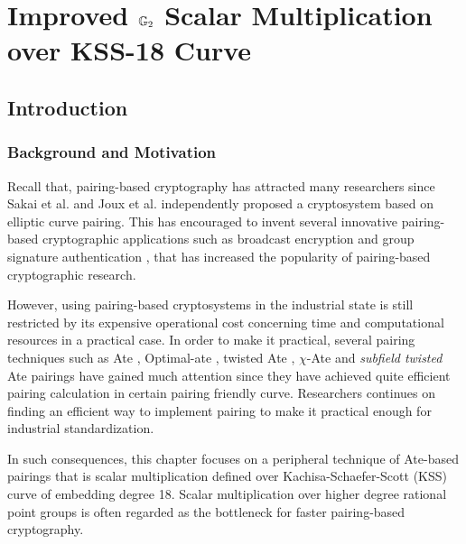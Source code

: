 \chapter{Improved \texorpdfstring{${\mathbb{G}}_{2}$}{G2} Scalar Multiplication over KSS-18 Curve} 
\label{Chapter_IEICE}
\section{Introduction}
\subsection{Background and Motivation}
Recall that, pairing-based cryptography has attracted many researchers since Sakai et al. \cite{EPRINT:SakKas03} and Joux et al. \cite{JC:Joux04} independently proposed a cryptosystem based on elliptic curve pairing. This has encouraged to invent several innovative pairing-based cryptographic applications such as broadcast encryption \cite{C:BonGenWat05} and group signature authentication \cite{C:BonBoySha04}, that has increased the popularity of pairing-based cryptographic research.

However, using pairing-based cryptosystems in the industrial state is still restricted by its expensive operational cost concerning time and computational resources in a practical case. 
In order to make it practical, several pairing techniques such as Ate \cite{DBLP:reference/crc/2005ehcc}, Optimal-ate \cite{DBLP:journals/tit/Vercauteren10}, twisted Ate \cite{EPRINT:MKHO07}, $\chi$-Ate \cite{PAIRING:NASKM08} and \textit{subfield twisted} Ate \cite{PAIRING:DevScoDah07} pairings have gained much attention since they have achieved quite efficient pairing calculation in certain pairing friendly curve. 
Researchers continues on finding an efficient way to implement pairing to make it practical enough for industrial standardization. 

In such consequences, this chapter focuses on a peripheral technique of Ate-based pairings that is scalar multiplication defined over Kachisa-Schaefer-Scott (KSS) curve \cite{EPRINT:KacSchSco07} of embedding degree 18. 
Scalar multiplication over higher degree rational point groups is often regarded as the bottleneck for faster pairing-based cryptography.

